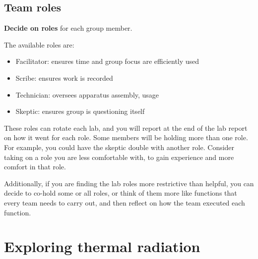 \subsection{Team roles}

\begin{steps}
	\item \textbf{Decide on roles} for each group member.
\end{steps}

The available roles are:
\begin{itemize}
	\item Facilitator: ensures time and group focus are efficiently used
	\item Scribe: ensures work is recorded
	\item Technician: oversees apparatus assembly, usage
	\item Skeptic: ensures group is questioning itself
\end{itemize}

These roles can rotate each lab, and you will report at the end of the lab report on how it went for each role. Some members will be holding more than one role. For example, you could have the skeptic double with another role. Consider taking on a role you are less comfortable with, to gain experience and more comfort in that role.

Additionally, if you are finding the lab roles more restrictive than helpful, you can decide to co-hold some or all roles, or think of them more like functions that every team needs to carry out, and then reflect on how the team executed each function.

%
%

\section{Exploring thermal radiation}\label{ic:sec:exploring}

